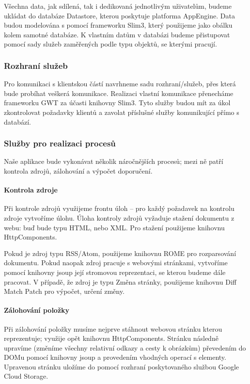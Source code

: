 Všechna data, jak sdílená, tak i dedikovaná jednotlivým uživatelům, budeme ukládat do databáze Datastore, kterou poskytuje platforma AppEngine.
Data budou modelována s pomocí frameworku Slim3, který použijeme jako obálku kolem samotné databáze.
K vlastním datům v databázi budeme přistupovat pomocí sady služeb zaměřených podle typu objektů, se kterými pracují.

\subsubsection{Rozhraní služeb}

Pro komunikaci s klientskou částí navrhneme sadu rozhraní/služeb, přes která bude probíhat veškerá komunikace.
Realizaci vlastní komunikace přenecháme frameworku GWT za účasti knihovny Slim3.
Tyto služby budou mít za úkol zkontrolovat požadavky klientů a zavolat příslušné služby komunikující přímo s databází.

\subsubsection{Služby pro realizaci procesů}

Naše aplikace bude vykonávat několik náročnějších procesů; mezi ně patří kontrola zdrojů, zálohování a výpočet doporučení.

\paragraph{Kontrola zdroje}
Při kontrole zdrojů využijeme frontu úloh -- pro každý požadavek na kontrolu zdroje vytvoříme úlohu.
Úloha kontroly zdrojů vyžaduje stažení dokumentu z webu: buď bude typu HTML, nebo XML.
Pro stažení použijeme knihovnu HttpComponents.

Pokud je zdroj typu RSS/Atom, použijeme knihovnu ROME pro rozparsování dokumentu.
Pokud naopak zdroj pracuje s webovými stránkami, vytvoříme pomocí knihovny jsoup její stromovou reprezentaci, se kterou budeme dále pracovat.
V případě, že zdroj je typu Změna stránky, použijeme knihovnu Diff Match Patch pro výpočet, určení změny.

\paragraph{Zálohování položky}
Při zálohování položky musíme nejprve stáhnout webovou stránku kterou reprezentuje; využije opět knihovnu HttpComponents.
Strán\-ku následně upravíme (změníme všechny relativní odkazy a cesty k obrázkům) převedením do DOMu pomocí knihovny jsoup a provedením vhodných operací s elementy.
Upravenou stránku uložíme do  pomocí rozhraní poskytovaného službou Google Cloud Storage.

